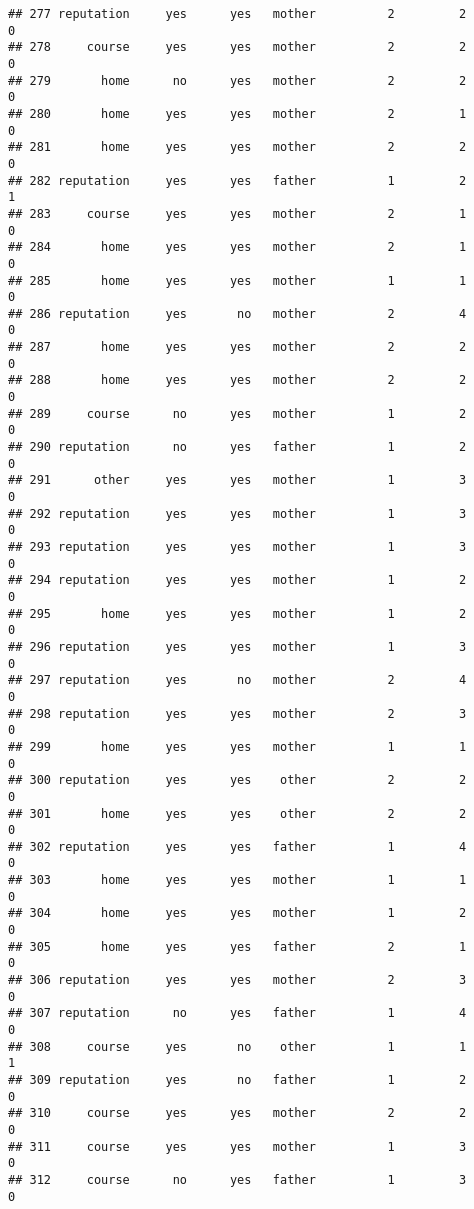 \documentclass[]{article}
\begin{document}
\begin{verbatim}
## 277 reputation     yes      yes   mother          2         2        0
## 278     course     yes      yes   mother          2         2        0
## 279       home      no      yes   mother          2         2        0
## 280       home     yes      yes   mother          2         1        0
## 281       home     yes      yes   mother          2         2        0
## 282 reputation     yes      yes   father          1         2        1
## 283     course     yes      yes   mother          2         1        0
## 284       home     yes      yes   mother          2         1        0
## 285       home     yes      yes   mother          1         1        0
## 286 reputation     yes       no   mother          2         4        0
## 287       home     yes      yes   mother          2         2        0
## 288       home     yes      yes   mother          2         2        0
## 289     course      no      yes   mother          1         2        0
## 290 reputation      no      yes   father          1         2        0
## 291      other     yes      yes   mother          1         3        0
## 292 reputation     yes      yes   mother          1         3        0
## 293 reputation     yes      yes   mother          1         3        0
## 294 reputation     yes      yes   mother          1         2        0
## 295       home     yes      yes   mother          1         2        0
## 296 reputation     yes      yes   mother          1         3        0
## 297 reputation     yes       no   mother          2         4        0
## 298 reputation     yes      yes   mother          2         3        0
## 299       home     yes      yes   mother          1         1        0
## 300 reputation     yes      yes    other          2         2        0
## 301       home     yes      yes    other          2         2        0
## 302 reputation     yes      yes   father          1         4        0
## 303       home     yes      yes   mother          1         1        0
## 304       home     yes      yes   mother          1         2        0
## 305       home     yes      yes   father          2         1        0
## 306 reputation     yes      yes   mother          2         3        0
## 307 reputation      no      yes   father          1         4        0
## 308     course     yes       no    other          1         1        1
## 309 reputation     yes       no   father          1         2        0
## 310     course     yes      yes   mother          2         2        0
## 311     course     yes      yes   mother          1         3        0
## 312     course      no      yes   father          1         3        0

\end{verbatim}
\end{document}
